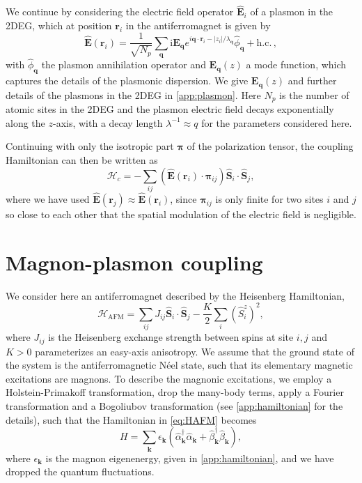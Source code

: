 \documentclass[aps,prb,reprint,twocolumns,superscriptaddress,nofootinbib]{revtex4-2}
\newcommand{\hc}{\text{h.c.}}
\newcommand{\ii}{\mathrm{i}}
\begin{document}
	
	
	We continue by considering the electric field operator $\hat{\bm E}_i$ of a plasmon in the 2DEG, which at position $\bm r_i$ in the antiferromagnet is given by \cite{ferreiraQuantizationGraphenePlasmons2020}
	\begin{equation}
		\hat{\bm E}(\bm r_i)= \frac{1}{\sqrt{N_p}}\sum_{\bm q} \ii \bm E_{\bm q}e^{i\bm q \cdot \bm r_i- |z_i|/\lambda_{\bm q}} \hat\phi_{\bm q} + \hc\, ,
	\end{equation}
	with $\hat\phi_{\bm q}$ the plasmon annihilation operator and $\bm E_{\bm q}(z)$ a mode function, which captures the details of the plasmonic dispersion. We give $\bm E_{\bm q}(z)$ and further details of the plasmons in the 2DEG in \cref{app:plasmon}. Here $N_p$ is the number of atomic sites in the 2DEG and the plasmon electric field decays exponentially along the $z$-axis, with a decay length $\lambda^{-1}\approx q$ for the parameters considered here. 
	
	
	
	Continuing with only the isotropic part $\bm \pi$ of the polarization tensor, the coupling Hamiltonian can then be written as
	\begin{equation}
		\mathcal H_c = -\sum_{ij} (\hat{\bm E}(\bm r_i) \cdot \bm\pi_{ij}) \hat{\bm S}_i \cdot \hat{\bm S}_j, \label{eq:Hc-pi}
	\end{equation}
	where we have used $\hat{\bm E}(\bm r_j) \approx \hat{\bm E}(\bm r_i)$, since $\bm\pi_{ij}$ is only finite for two sites $i$ and $j$ so close to each other that the spatial modulation of the electric field is negligible.
	

	
	
	
	
	\section{Magnon-plasmon coupling}
	\label{sec:method}
	We consider here an antiferromagnet described by the Heisenberg Hamiltonian,
	\begin{equation}
		\mathcal H_{\mathrm{AFM}} = \sum_{ij}J_{ij}\hat{ \bm S}_i \cdot \hat{ \bm S}_j - \frac{K}{2}\sum_i (\hat S^z_i)^2, \label{eq:HAFM}
	\end{equation}
	where $J_{ij}$ is the Heisenberg exchange strength between spins at site $i,j$ and $K>0$ parameterizes an easy-axis anisotropy. We assume that the ground state of the system is the antiferromagnetic Néel state, such that its elementary magnetic excitations are magnons. To describe the magnonic excitations, we employ a Holstein-Primakoff transformation, drop the many-body terms, apply a Fourier transformation and
	a Bogoliubov transformation (see \cref{app:hamiltonian} for the details), such that the Hamiltonian in \cref{eq:HAFM} becomes 
	\begin{equation}
		H=\sum_{\bm k} \epsilon_{\bm k} \left(  \hat \alpha_{\bm k}^\dagger \hat \alpha_{\bm k} + \hat\beta_{\bm k}^\dagger \hat\beta_{\bm k} \right),
	\end{equation}
	where $\epsilon_{\bm k}$ is the magnon eigenenergy, given in \cref{app:hamiltonian}, and we have dropped the quantum fluctuations.
	
\end{document}
